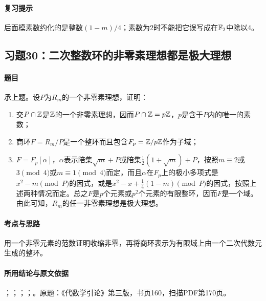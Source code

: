 \paragraph{复习提示}

后面模素数约化的是整数$(1-m)/4$；素数为2时不能把它误写成在$\mathbb F_2$中除以4。

\subsection{习题30：二次整数环的非零素理想都是极大理想}

\label{ex:4:30}

\paragraph{题目}

承上题。设$P$为$R_m$的一个非零素理想，证明：
\begin{enumerate}[label=(\roman*)]
\item 交$P\cap\mathbb Z$是$\mathbb Z$的一个非零素理想，因而$P\cap\mathbb Z=p\mathbb Z$，$p$是含于$P$内的唯一的素数；
\item 商环$F=R_m/P$是一个整环而且包含$F_p=\mathbb Z/p\mathbb Z$作为子域；
\item $F=F_p[\alpha]$，$\alpha$表示陪集$\sqrt m+P$或陪集$\tfrac12(1+\sqrt m)+P$，按照$m\equiv2$或$3\pmod4$或$m\equiv1\pmod4$而定，而且$\alpha$在$F_p$上的极小多项式是$x^2-m\pmod P$的因式，或是$x^2-x+\tfrac14(1-m)\pmod P$的因式，按照上述两种情况而定。总之$F$是$p$个元素或$p^2$个元素的有限整环，因而$F$是一个域。由此可知，$R_m$的任一非零素理想是极大理想。
\end{enumerate}

\paragraph{考点与思路}

用一个非零元素的范数证明收缩非零，再将商环表示为有限域上由一个二次代数元生成的整环。

\paragraph{所用结论与原文依据}

；；；；。原题：《代数学引论》第三版，书页160，扫描PDF第170页。


